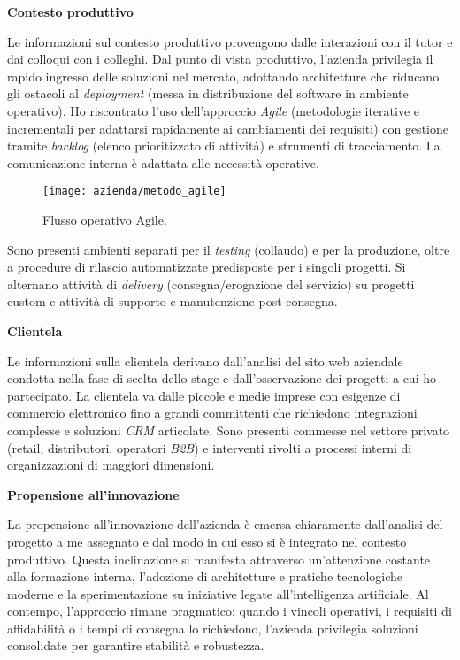 \medskip
\noindent\textbf{Contesto produttivo}

Le informazioni sul contesto produttivo provengono dalle interazioni con il tutor e dai colloqui con i colleghi. 
Dal punto di vista produttivo, l'azienda privilegia il rapido ingresso delle soluzioni nel mercato, adottando architetture che riducano gli ostacoli al 
\emph{deployment} (messa in distribuzione del software in ambiente operativo). Ho riscontrato l'uso dell'approccio \emph{Agile} (metodologie iterative e incrementali per adattarsi rapidamente ai cambiamenti dei requisiti) 
con gestione tramite \emph{backlog} (elenco prioritizzato di attività) e strumenti di tracciamento. La comunicazione interna è adattata alle necessità operative.

\begin{figure}[htbp]
    \centering
    \texttt{[image: azienda/metodo\_agile]}
    \caption{Flusso operativo Agile.}
    \label{fig:agile}
\end{figure}

Sono presenti ambienti separati per il \emph{testing} (collaudo) e per la produzione, oltre a procedure di rilascio automatizzate predisposte per i singoli progetti. 
Si alternano attività di \emph{delivery} (consegna/erogazione del servizio) su progetti custom e attività di supporto e manutenzione post-consegna.

\medskip
\noindent\textbf{Clientela}

Le informazioni sulla clientela derivano dall'analisi del sito web aziendale condotta nella fase di scelta dello stage e dall'osservazione dei progetti a cui ho partecipato. 
La clientela va dalle piccole e medie imprese con esigenze di commercio elettronico fino a grandi committenti che richiedono integrazioni complesse e soluzioni \emph{CRM} articolate. 
Sono presenti commesse nel settore privato (retail, distributori, operatori \emph{B2B}) e interventi rivolti a processi interni di organizzazioni di maggiori dimensioni.

\medskip
\noindent\textbf{Propensione all'innovazione}

La propensione all'innovazione dell'azienda è emersa chiaramente dall'analisi del progetto a me assegnato e dal modo in cui esso si è integrato nel contesto produttivo. 
Questa inclinazione si manifesta attraverso un'attenzione costante alla formazione interna, l'adozione di architetture e pratiche tecnologiche moderne e la sperimentazione su 
iniziative legate all'intelligenza artificiale. Al contempo, l'approccio rimane pragmatico: quando i vincoli operativi, i requisiti di affidabilità o i tempi di consegna lo richiedono, 
l'azienda privilegia soluzioni consolidate per garantire stabilità e robustezza.

